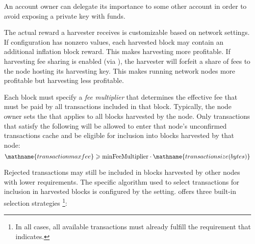 An account owner can delegate its importance to some other account in order to avoid exposing a private key with funds.

The actual reward a harvester receives is customizable based on network settings.
If  configuration has nonzero values, each harvested block may contain an additional inflation block reward.
This makes harvesting more profitable.
If harvesting fee sharing is enabled (via ), the harvester will forfeit a share of fees to the node hosting its harvesting key.
This makes running network nodes more profitable but harvesting less profitable.


Each block must specify a \emph{fee multiplier} that determines the effective fee that must be paid by all transactions included in that block.
Typically, the node owner sets the  that applies to all blocks harvested by the node.
Only transactions that satisfy the following will be allowed to enter that node's unconfirmed transactions cache and be eligible for inclusion into blocks harvested by that node:
\begin{equation}
	\mathname{transaction max fee} \geqslant \nemsetting{node}{minFeeMultiplier} \cdot \mathname{transaction size (bytes)}
\end{equation}

Rejected transactions may still be included in blocks harvested by other nodes with lower requirements.
The specific algorithm used to select transactions for inclusion in harvested blocks is configured by the  setting.
\codenamespace offers three built-in selection strategies
\footnote{In all cases, all available transactions must already fulfill the requirement that  indicates.}:

